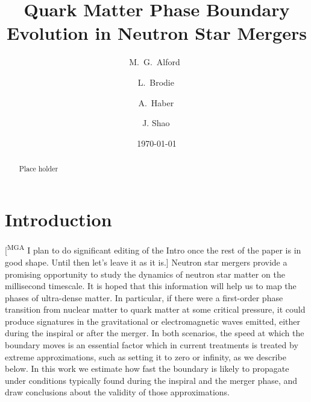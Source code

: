\documentclass[10pt,superscriptaddress,
amsmath,aps,prc,twocolumn,nofootinbib,floatfix]{revtex4-1}
\newcommand{\mgacom}[1]{\textsf{\color[rgb]{0.8,0,0}[\textsuperscript{MGA} #1]}}
\newcommand{\AH}[1]{{\color{cyan}#1}}
\newcommand{\AHcom}[1]{\textsf{\color{cyan}{\textsuperscript{AH}#1}}}
\begin{document}
\title{Quark Matter Phase Boundary Evolution in Neutron Star Mergers}
 \author{M.~G.~Alford \,}
 \author{L.~Brodie\,}
 \author{A.~Haber\,}
 \author{J. Shao\,}

\date{\today}

\begin{abstract}
Place holder
\end{abstract}

\maketitle

\section{Introduction}

\mgacom{I plan to do significant editing of the Intro once the rest of the paper is in good shape. Until then let's leave it as it is.}
Neutron star mergers provide a promising  opportunity to study the dynamics of neutron star matter on the millisecond timescale. It is hoped that this information will help us to map the phases of ultra-dense matter. In particular, if there were a first-order phase transition from nuclear matter to quark matter at some critical pressure, it could produce signatures in the gravitational or electromagnetic waves emitted, either during the inspiral or after the merger. \AHcom{cite both PRLs already here?}In both scenarios, the speed at which the boundary moves is an essential factor which in current treatments is treated by extreme approximations, such as setting it to zero or infinity, as we describe below. In this work we estimate how fast the boundary is likely to propagate under conditions typically found \AH{during the inspiral and the merger phase}, and draw conclusions about the validity of those approximations.
\end{document}
